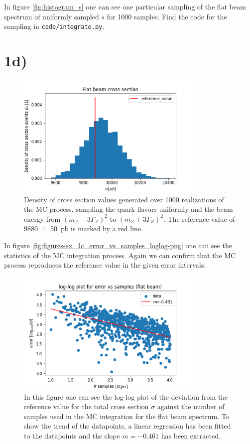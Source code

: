 \documentclass[12pt,a4paper]{scrartcl}
\begin{document}
In figure \eqref{fig:histogram_s} one can see one particular sampling of the flat beam spectrum of uniformly sampled $s$ for \num{1000} samples.
Find the code for the sampling in \lstinline{code/integrate.py}.


\section*{1d)}

\begin{figure}[htpb]
    \centering
    \includegraphics[width=0.8\textwidth]{figures/ex_1c_flat_beam_hist.png}
    \caption{
        Density of cross section values generated over \num{1000} realizations of the MC process, sampling the quark flavors uniformly and the beam energy from $(m_Z - 3 \Gamma_Z)^2$ to $(m_Z + 3 \Gamma_Z)^2$.
        The reference value of \SI{9880(50)}{\pico\barn} is marked by a red line.
    }
    \label{fig:figures-ex_1c_err}
\end{figure}

In figure \eqref{fig:figures-ex_1c_error_vs_samples_loglog-png} one can see the statistics of the MC integration process.
Again we can confirm that the MC process reproduces the reference value in the given error intervals.

\begin{figure}[htpb]
    \centering
    \includegraphics[width=0.8\textwidth]{figures/ex_1c_error_vs_samples_loglog.png}
    \caption{
        In this figure one can see the log-log plot of the deviation from the reference value for the total cross section $\sigma$ against the number of samples used in the MC integration for the flat beam spectrum.
        To show the trend of the datapoints, a linear regression has been fitted to the datapoints and the slope $m = -0.461$ has been extracted.
    }
    \label{fig:figures-ex_1c_error_vs_samples_loglog-png}
\end{figure}
\end{document}
